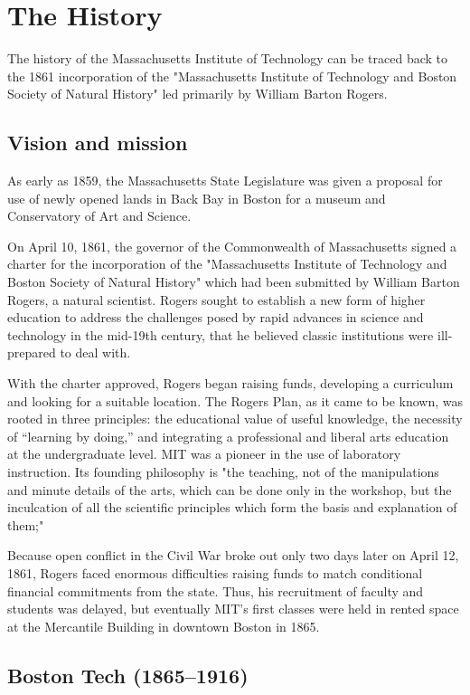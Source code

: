 \section{The History}

The history of the Massachusetts Institute of Technology can be traced back to the 1861 incorporation of the "Massachusetts Institute of Technology and Boston Society of Natural History" led primarily by William Barton Rogers.

\subsection{Vision and mission}

As early as 1859, the Massachusetts State Legislature was given a proposal for use of newly opened lands in Back Bay in Boston for a museum and Conservatory of Art and Science.

On April 10, 1861, the governor of the Commonwealth of Massachusetts signed a charter for the incorporation of the "Massachusetts Institute of Technology and Boston Society of Natural History" which had been submitted by William Barton Rogers, a natural scientist. Rogers sought to establish a new form of higher education to address the challenges posed by rapid advances in science and technology in the mid-19th century, that he believed classic institutions were ill-prepared to deal with.

With the charter approved, Rogers began raising funds, developing a curriculum and looking for a suitable location. The Rogers Plan, as it came to be known, was rooted in three principles: the educational value of useful knowledge, the necessity of “learning by doing,” and integrating a professional and liberal arts education at the undergraduate level. MIT was a pioneer in the use of laboratory instruction. Its founding philosophy is "the teaching, not of the manipulations and minute details of the arts, which can be done only in the workshop, but the inculcation of all the scientific principles which form the basis and explanation of them;"

Because open conflict in the Civil War broke out only two days later on April 12, 1861, Rogers faced enormous difficulties raising funds to match conditional financial commitments from the state. Thus, his recruitment of faculty and students was delayed, but eventually MIT's first classes were held in rented space at the Mercantile Building in downtown Boston in 1865.

\subsection{Boston Tech (1865–1916)}

